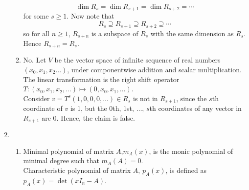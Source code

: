 \documentclass[12pt]{article}
\theoremstyle{definition}
\begin{document}
\begin{enumerate}
\begin{enumerate}
  \[
\dim R_s = \dim R_{s+1} = \dim R_{s+2} = \cdots   
\]
for some $s\geq 1$. Now note that
\[
R_s\supseteq R_{s+1}\supseteq R_{s+2}\supseteq \cdots
\]
so for all $n\geq 1$, $R_{s+n}$ is a subspace of $R_s$ with the same dimension as $R_s$. Hence $R_{s+n}=R_s$.
\item No. Let $V$ be the vector space of infinite sequence of real numbers $(x_0,x_1,x_2\ldots)$, under componentwise addition and scalar multiplication. The linear transformation is the right shift operator $T: (x_0,x_1,x_2,\ldots)\mapsto (0,x_0,x_1,\ldots)$. \\Consider $v = T^s(1,0,0,0,\ldots)\in R_s$ is not in $R_{s+1}$, since the $s$th coordinate of $v$ is 1, but the $0$th, $1$st, $\ldots$, $s$th coordinates of any vector in $R_{s+1}$ are 0. Hence, the claim is false.
\end{enumerate}
\item 
\begin{enumerate}
\item Minimal polynomial of matrix $A$,$m_A(x)$, is the monic polynomial of minimal degree such that $m_A(A) = 0$.\\Characteristic polynomial of matrix $A$, $p_A(x)$, is defined as $p_A(x) = \det(xI_n-A)$.


\end{enumerate}
\end{enumerate}
\end{document}
